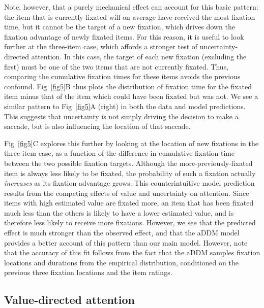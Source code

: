 Note, however, that a purely mechanical effect can account for this basic pattern: the item that is currently fixated will on average have received the most fixation time, but it cannot be the target of a new fixation, which drives down the fixation advantage of newly fixated items. For this reason, it is useful to look further at the three-item case, which affords a stronger test of uncertainty-directed attention. In this case, the target of each new fixation (excluding the first) must be one of the two items that are not currently fixated. Thus, comparing the cumulative fixation times for these items avoids the previous confound. Fig~\ref{fig5}B thus plots the distribution of fixation time for the fixated item minus that of the item which could have been fixated but was not. We see a similar pattern to Fig~\ref{fig5}A (right) in both the data and model predictions. This suggests that uncertainty is not simply driving the decision to make a saccade, but is also influencing the location of that saccade.

Fig~\ref{fig5}C explores this further by looking at the location of new fixations in the three-item case, as a function of the difference in cumulative fixation time between the two possible fixation targets. Although the more-previously-fixated item is always less likely to be fixated, the probability of such a fixation actually \emph{increases} as its fixation advantage grows. This counterintuitive model prediction results from the competing effects of value and uncertainty on attention. Since items with high estimated value are fixated more, an item that has been fixated much less than the others is likely to have a lower estimated value, and is therefore less likely to receive more fixations. However, we see that the predicted effect is much stronger than the observed effect, and that the aDDM model provides a better account of this pattern than our main model. However, note that the accuracy of this fit follows from the fact that the aDDM samples fixation locations and durations from the empirical distribution, conditioned on the previous three fixation locations and the item ratings. 


\subsection{Value-directed attention}

